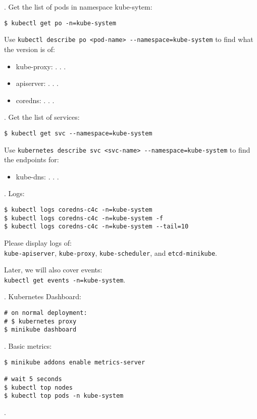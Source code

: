 \documentclass[12pt, letterpaper]{article}
\begin{document}
. Get the list of pods in namespace kube-sytem:

\begin{verbatim}
$ kubectl get po -n=kube-system
\end{verbatim}

Use \verb|kubectl describe po <pod-name> --namespace=kube-system| to find what the version is of:
\begin{itemize}
    \item kube-proxy: . . .
    \item apiserver: . . .
    \item coredns: . . .
\end{itemize}

. Get the list of services:

\begin{verbatim}
$ kubectl get svc --namespace=kube-system
\end{verbatim}

Use \verb|kubernetes describe svc <svc-name> --namespace=kube-system| to find the endpoints for:
\begin{itemize}
\item kube-dns: . . .
\end{itemize}

. Logs:

\begin{verbatim}
$ kubectl logs coredns-c4c -n=kube-system
$ kubectl logs coredns-c4c -n=kube-system -f
$ kubectl logs coredns-c4c -n=kube-system --tail=10
\end{verbatim}

Please display logs of:\\
\verb|kube-apiserver|, \verb|kube-proxy|, \verb|kube-scheduler|, and \verb|etcd-minikube|.

Later, we will also cover events:\\
\texttt{kubectl get events -n=kube-system}.

. Kubernetes Dashboard:

\begin{verbatim}
# on normal deployment:
# $ kubernetes proxy
$ minikube dashboard
\end{verbatim}

. Basic metrics:

\begin{verbatim}
$ minikube addons enable metrics-server

# wait 5 seconds
$ kubectl top nodes
$ kubectl top pods -n kube-system
\end{verbatim}

. 
\end{document}
